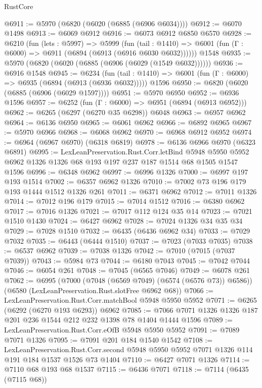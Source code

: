 \begin{lexlean}{RustCore}
\begin{coremodule}
{\begin{coremodule}
{{{{{{{{{{{{{{{{{{{{{{{{{{{{{{{{{{{{{{{{{{{{{@6911 := @5970 (@6820 (@6020 (@6885 (@6906 @6034))))
@6912 := @6070 @1498
@6913 := @6069 @6912
@6916 := @6073 @6912 @6850 @6570
@6928 := @6210
    (fun (lets : @5997) =>
    @5999
      (fun (tail : @1410) => @6001 (fun (Γ : @6000) => @6911 (@6894 (@6913 (@6916 @6030 @6032))))))
    @1548
@6935 := @5970 (@6820 (@6020 (@6885 (@6906 (@6029 (@1549 @6032))))))
@6936 := @6916 @1548
@6945 := @6234
    (fun (tail : @1410) => @6001 (fun (Γ : @6000) => @6935 (@6894 (@6913 (@6936 @6032)))))
    @1596
@6950 := @6820 (@6020 (@6885 (@6906 (@6029 @1597))))
@6951 := @5970 @6950
@6952 := @6936 @1596
@6957 := @6252 (fun (Γ : @6000) => @6951 (@6894 (@6913 @6952)))
@6962 := @6265 (@6297 (@6270 @35 @6298)) @6048
@6963 := @6957 @6962
@6964 := @6136 @6950
@6965 := @6061 @6962
@6966 := @6892 @6965
@6967 := @5970 @6966
@6968 := @6068 @6962
@6970 := @6968 @6912 @6952
@6974 := @6964 (@6967 @6970) (@6318 @6819)
@6978 := @6136 @6966 @6970 (@6323 @6891)
@6995 := LexLeanPreservation.Rust.Corr.letBind
    @5948
    @5950
    @5952
    @6962
    @1326
    @1326
    @68
    @193
    @197
    @237
    @187
    @1514
    @68
    @1505
    @1547
    @1596
@6996 := @6348 @6962
@6997 := @6996 @1326
@7000 := @6997 @197 @193 @1514
@7002 := @6357 @6962 @1326
@7010 := @7002 @73 @196 @179 @193 @1444 @1512 @1326 @261
@7011 := @6371 @6962
@7012 := @7011 @1326
@7014 := @7012 @196 @179
@7015 := @7014 @1512
@7016 := @6380 @6962
@7017 := @7016 @1326
@7021 := @7017 @112 @124 @35 @14
@7023 := @7021 @1510 @1430
@7024 := @6427 @6962
@7028 := @7024 @1326 @34 @35 @34
@7029 := @7028 @1510
@7032 := @6435 (@6436 @6962 @34)
@7033 := @7029 @7032
@7035 := @6443 (@6444 @1510)
@7037 := @7023 (@7033 @7035)
@7038 := @6537 @6962
@7039 := @7038 @1326
@7042 := @7010 (@7015 (@7037 @7039))
@7043 := @5984 @73
@7044 := @6180 @7043
@7045 := @7042 @7044
@7046 := @6054 @261
@7048 := @7045 (@6565 @7046)
@7049 := @6078 @261
@7062 := @6995
    (@7000 (@7048 (@6569 @7049) (@6574 (@6576 @73)) @6586))
    (@6580 (LexLeanPreservation.Rust.slotFree @6962 @68))
@7066 := LexLeanPreservation.Rust.Corr.matchBool @5948 @5950 @5952
@7071 := @6265 (@6292 (@6270 @193 @6293)) @6962
@7085 := @7066 @7071 @1326 @1326 @187 @201 @236 @1544 @212 @232 @1398 @78 @1404 @1444 @1596
@7089 := LexLeanPreservation.Rust.Corr.eOfB @5948 @5950 @5952
@7091 := @7089 @7071 @1326
@7095 := @7091 @201 @184 @1540 @1542
@7108 := LexLeanPreservation.Rust.Corr.second
    @5948
    @5950
    @5952
    @7071
    @1326
    @114
    @191
    @184
    @1537
    @1526
    @73
    @1404
@7110 := @6427 @7071 @1326
@7114 := @7110 @68 @193 @68 @1537
@7115 := @6436 @7071
@7118 := @7114 (@6435 (@7115 @68))
}}}}}}}}}}}}}}}}}}}}}}}}}}}}}}}}}}}}}}}}}}}}}
\end{coremodule}}
\end{coremodule}
\end{lexlean}
